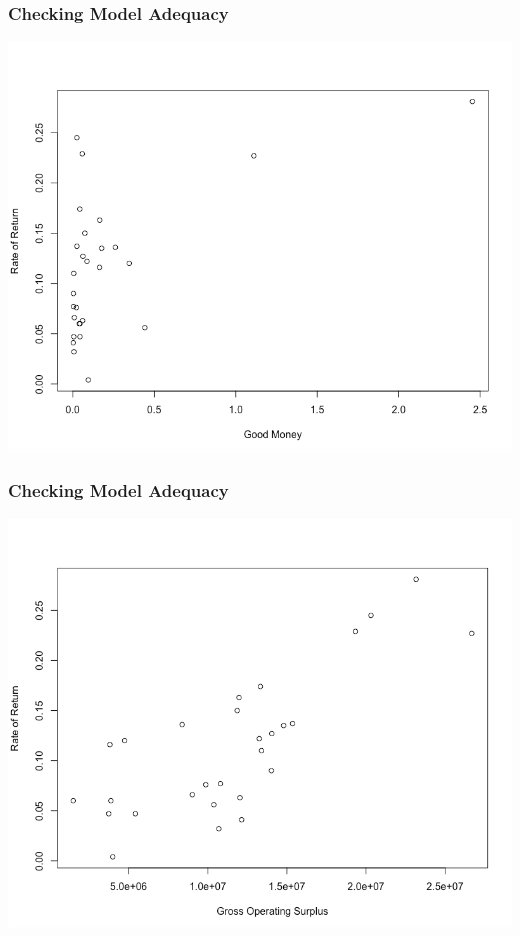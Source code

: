 \documentclass[12pt]{beamer}
\begin{document}
\begin{frame}
\frametitle{Checking Model Adequacy}
\begin{center}
\includegraphics[scale=0.3]{pic1.png}
\end{center}
\end{frame}
\begin{frame}
\frametitle{Checking Model Adequacy}
\begin{center}
\includegraphics[scale=0.3]{pic2.png}
\end{center}
\end{frame}
\end{document}
